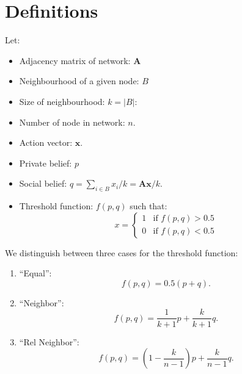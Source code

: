 \documentclass[10pt,a4paper]{article}
\author{Christoph Aymanns}
\begin{document}
\section{Definitions}
Let:
\begin{itemize}
\item Adjacency matrix of network: $\mathbf{A}$
\item Neighbourhood of a given node: $B$ 
\item Size of neighbourhood: $k =|B|$: 
\item Number of node in network: $n$.
\item Action vector: $\mathbf{x}$.
\item Private belief: $p$ 
\item Social belief: $q = \sum_{i \in B} x_i / k = \mathbf{A} \mathbf{x} / k$. 
\item Threshold function: $f(p,q)$ such that:
\begin{equation}
x = \begin{cases} 1 &\mbox{if } f(p,q) > 0.5  \\
0 & \mbox{if } f(p,q) < 0.5 \end{cases}
\end{equation}
\end{itemize}
We distinguish between three cases for the threshold function:
\begin{enumerate}
\item ``Equal'':
\begin{equation}
f(p,q) = 0.5(p+q).
\end{equation}
\item ``Neighbor'':
\begin{equation}
f(p,q) = \frac{1}{k+1}p + \frac{k}{k+1}q.
\end{equation}
\item ``Rel Neighbor'':
\begin{equation}
f(p,q) = \left(1 - \frac{k}{n-1}\right) p + \frac{k}{n-1}q.
\end{equation}
\end{enumerate}
\end{document}
